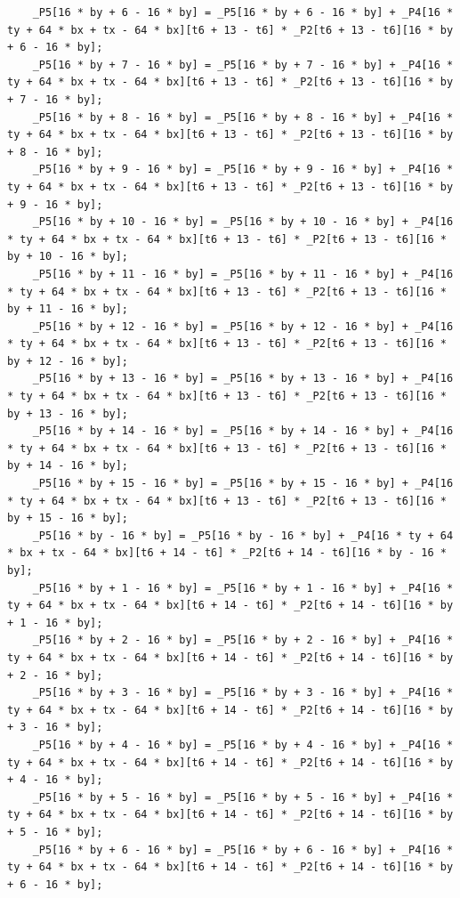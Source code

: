 \documentclass[msthesis,justified,copyright,final,numbers,sort&compress,
gsmodern,amstex,natbib]{uothesis}
\begin{document}
\begin{lstlisting}
    _P5[16 * by + 6 - 16 * by] = _P5[16 * by + 6 - 16 * by] + _P4[16 * ty + 64 * bx + tx - 64 * bx][t6 + 13 - t6] * _P2[t6 + 13 - t6][16 * by + 6 - 16 * by];
    _P5[16 * by + 7 - 16 * by] = _P5[16 * by + 7 - 16 * by] + _P4[16 * ty + 64 * bx + tx - 64 * bx][t6 + 13 - t6] * _P2[t6 + 13 - t6][16 * by + 7 - 16 * by];
    _P5[16 * by + 8 - 16 * by] = _P5[16 * by + 8 - 16 * by] + _P4[16 * ty + 64 * bx + tx - 64 * bx][t6 + 13 - t6] * _P2[t6 + 13 - t6][16 * by + 8 - 16 * by];
    _P5[16 * by + 9 - 16 * by] = _P5[16 * by + 9 - 16 * by] + _P4[16 * ty + 64 * bx + tx - 64 * bx][t6 + 13 - t6] * _P2[t6 + 13 - t6][16 * by + 9 - 16 * by];
    _P5[16 * by + 10 - 16 * by] = _P5[16 * by + 10 - 16 * by] + _P4[16 * ty + 64 * bx + tx - 64 * bx][t6 + 13 - t6] * _P2[t6 + 13 - t6][16 * by + 10 - 16 * by];
    _P5[16 * by + 11 - 16 * by] = _P5[16 * by + 11 - 16 * by] + _P4[16 * ty + 64 * bx + tx - 64 * bx][t6 + 13 - t6] * _P2[t6 + 13 - t6][16 * by + 11 - 16 * by];
    _P5[16 * by + 12 - 16 * by] = _P5[16 * by + 12 - 16 * by] + _P4[16 * ty + 64 * bx + tx - 64 * bx][t6 + 13 - t6] * _P2[t6 + 13 - t6][16 * by + 12 - 16 * by];
    _P5[16 * by + 13 - 16 * by] = _P5[16 * by + 13 - 16 * by] + _P4[16 * ty + 64 * bx + tx - 64 * bx][t6 + 13 - t6] * _P2[t6 + 13 - t6][16 * by + 13 - 16 * by];
    _P5[16 * by + 14 - 16 * by] = _P5[16 * by + 14 - 16 * by] + _P4[16 * ty + 64 * bx + tx - 64 * bx][t6 + 13 - t6] * _P2[t6 + 13 - t6][16 * by + 14 - 16 * by];
    _P5[16 * by + 15 - 16 * by] = _P5[16 * by + 15 - 16 * by] + _P4[16 * ty + 64 * bx + tx - 64 * bx][t6 + 13 - t6] * _P2[t6 + 13 - t6][16 * by + 15 - 16 * by];
    _P5[16 * by - 16 * by] = _P5[16 * by - 16 * by] + _P4[16 * ty + 64 * bx + tx - 64 * bx][t6 + 14 - t6] * _P2[t6 + 14 - t6][16 * by - 16 * by];
    _P5[16 * by + 1 - 16 * by] = _P5[16 * by + 1 - 16 * by] + _P4[16 * ty + 64 * bx + tx - 64 * bx][t6 + 14 - t6] * _P2[t6 + 14 - t6][16 * by + 1 - 16 * by];
    _P5[16 * by + 2 - 16 * by] = _P5[16 * by + 2 - 16 * by] + _P4[16 * ty + 64 * bx + tx - 64 * bx][t6 + 14 - t6] * _P2[t6 + 14 - t6][16 * by + 2 - 16 * by];
    _P5[16 * by + 3 - 16 * by] = _P5[16 * by + 3 - 16 * by] + _P4[16 * ty + 64 * bx + tx - 64 * bx][t6 + 14 - t6] * _P2[t6 + 14 - t6][16 * by + 3 - 16 * by];
    _P5[16 * by + 4 - 16 * by] = _P5[16 * by + 4 - 16 * by] + _P4[16 * ty + 64 * bx + tx - 64 * bx][t6 + 14 - t6] * _P2[t6 + 14 - t6][16 * by + 4 - 16 * by];
    _P5[16 * by + 5 - 16 * by] = _P5[16 * by + 5 - 16 * by] + _P4[16 * ty + 64 * bx + tx - 64 * bx][t6 + 14 - t6] * _P2[t6 + 14 - t6][16 * by + 5 - 16 * by];
    _P5[16 * by + 6 - 16 * by] = _P5[16 * by + 6 - 16 * by] + _P4[16 * ty + 64 * bx + tx - 64 * bx][t6 + 14 - t6] * _P2[t6 + 14 - t6][16 * by + 6 - 16 * by];

\end{lstlisting}
\end{document}
